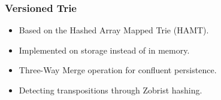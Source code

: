 \begin{frame}[fragile]
	\frametitle{Versioned Trie}

	\begin{itemize}
		\item Based on the Hashed Array Mapped Trie (HAMT).
		\item Implemented on storage instead of in memory.
		\item Three-Way Merge operation for confluent persistence.
		\item Detecting transpositions through Zobrist hashing.
	\end{itemize}

\end{frame}